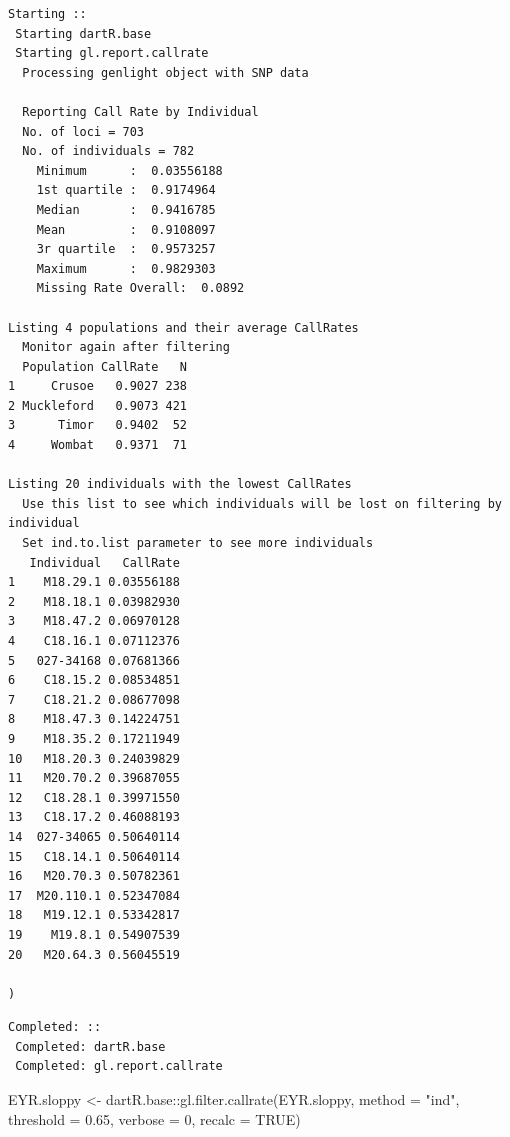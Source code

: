 \documentclass[
  letterpaper,
  DIV=11,
  numbers=noendperiod]{scrreprt}
\newenvironment{Shaded}{\begin{snugshade}}{\end{snugshade}}
\newcommand{\AttributeTok}[1]{\textcolor[rgb]{0.49,0.56,0.16}{#1}}
\newcommand{\ConstantTok}[1]{\textcolor[rgb]{0.53,0.00,0.00}{#1}}
\newcommand{\DecValTok}[1]{\textcolor[rgb]{0.25,0.63,0.44}{#1}}
\newcommand{\FloatTok}[1]{\textcolor[rgb]{0.25,0.63,0.44}{#1}}
\newcommand{\FunctionTok}[1]{\textcolor[rgb]{0.02,0.16,0.49}{#1}}
\newcommand{\NormalTok}[1]{\textcolor[rgb]{0.00,0.44,0.13}{#1}}
\newcommand{\OtherTok}[1]{\textcolor[rgb]{0.00,0.44,0.13}{#1}}
\newcommand{\SpecialCharTok}[1]{\textcolor[rgb]{0.25,0.44,0.63}{#1}}
\newcommand{\StringTok}[1]{\textcolor[rgb]{0.25,0.44,0.63}{#1}}
\let\textttOrig\texttt
\renewcommand{\texttt}[1]{\textttOrig{\color{blue}{#1}}}
\begin{document}
\begin{verbatim}
Starting :: 
 Starting dartR.base 
 Starting gl.report.callrate 
  Processing genlight object with SNP data

  Reporting Call Rate by Individual
  No. of loci = 703 
  No. of individuals = 782 
    Minimum      :  0.03556188 
    1st quartile :  0.9174964 
    Median       :  0.9416785 
    Mean         :  0.9108097 
    3r quartile  :  0.9573257 
    Maximum      :  0.9829303 
    Missing Rate Overall:  0.0892 

Listing 4 populations and their average CallRates
  Monitor again after filtering
  Population CallRate   N
1     Crusoe   0.9027 238
2 Muckleford   0.9073 421
3      Timor   0.9402  52
4     Wombat   0.9371  71

Listing 20 individuals with the lowest CallRates
  Use this list to see which individuals will be lost on filtering by individual
  Set ind.to.list parameter to see more individuals
   Individual   CallRate
1    M18.29.1 0.03556188
2    M18.18.1 0.03982930
3    M18.47.2 0.06970128
4    C18.16.1 0.07112376
5   027-34168 0.07681366
6    C18.15.2 0.08534851
7    C18.21.2 0.08677098
8    M18.47.3 0.14224751
9    M18.35.2 0.17211949
10   M18.20.3 0.24039829
11   M20.70.2 0.39687055
12   C18.28.1 0.39971550
13   C18.17.2 0.46088193
14  027-34065 0.50640114
15   C18.14.1 0.50640114
16   M20.70.3 0.50782361
17  M20.110.1 0.52347084
18   M19.12.1 0.53342817
19    M19.8.1 0.54907539
20   M20.64.3 0.56045519

)
\end{verbatim}

\begin{figure}[H]

{\centering \texttt{[image: Session10\_SexLinkedMarkers\_files/figure-pdf/unnamed-chunk-13-4.pdf]}

}

\end{figure}

\begin{verbatim}
Completed: :: 
 Completed: dartR.base 
 Completed: gl.report.callrate 
\end{verbatim}

\begin{Shaded}
\begin{Highlighting}[]
\NormalTok{EYR.sloppy }\OtherTok{\textless{}{-}}\NormalTok{ dartR.base}\SpecialCharTok{::}\FunctionTok{gl.filter.callrate}\NormalTok{(EYR.sloppy, }\AttributeTok{method =} \StringTok{"ind"}\NormalTok{,}
    \AttributeTok{threshold =} \FloatTok{0.65}\NormalTok{, }\AttributeTok{verbose =} \DecValTok{0}\NormalTok{, }\AttributeTok{recalc =} \ConstantTok{TRUE}\NormalTok{)}
\end{Highlighting}
\end{Shaded}
\end{document}
